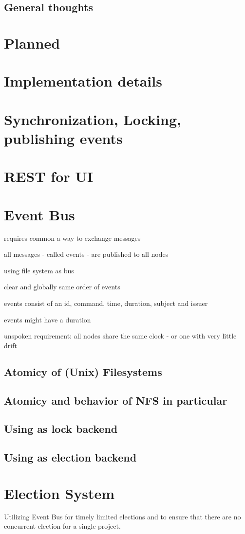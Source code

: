 \subsection{General thoughts}

\section{Planned}

\section{Implementation details}

\section{Synchronization, Locking, publishing events}

\section{REST for UI}



\section{Event Bus}

requires common a way to exchange messages

all messages - called events - are published to all nodes

using file system as bus

clear and globally same order of events

events consist of an id, command, time, duration, subject and issuer

events might have a duration

unspoken requirement: all nodes share the same clock - or one with very little drift

\subsection{Atomicy of (Unix) Filesystems}

\subsection{Atomicy and behavior of NFS in particular}

\subsection{Using as lock backend}

\subsection{Using as election backend}



\section{Election System}

Utilizing Event Bus for timely limited elections and to ensure that there are no concurrent election for a single project.

